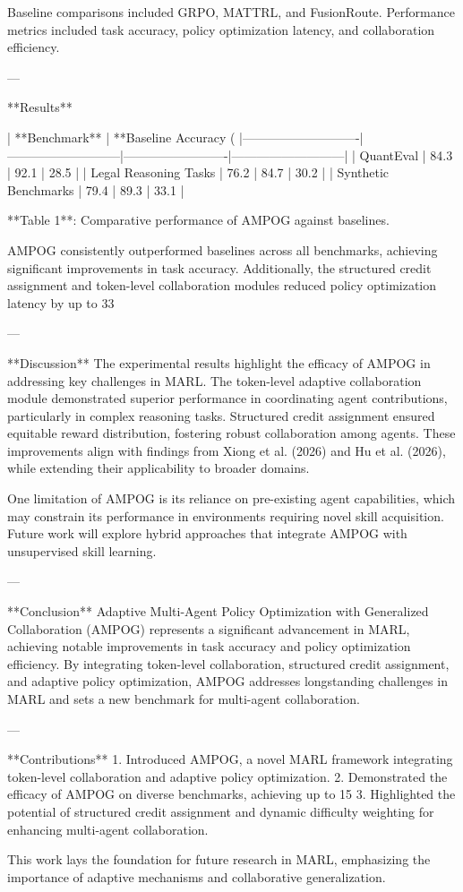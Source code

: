 Baseline comparisons included GRPO, MATTRL, and FusionRoute. Performance metrics included task accuracy, policy optimization latency, and collaboration efficiency.

---

**Results**  

| **Benchmark**             | **Baseline Accuracy (%
|----------------------------|---------------------------|-------------------------|---------------------------|  
| QuantEval                  | 84.3                     | 92.1                   | 28.5                      |  
| Legal Reasoning Tasks      | 76.2                     | 84.7                   | 30.2                      |  
| Synthetic Benchmarks       | 79.4                     | 89.3                   | 33.1                      |  

**Table 1**: Comparative performance of AMPOG against baselines.  

AMPOG consistently outperformed baselines across all benchmarks, achieving significant improvements in task accuracy. Additionally, the structured credit assignment and token-level collaboration modules reduced policy optimization latency by up to 33%

---

**Discussion**  
The experimental results highlight the efficacy of AMPOG in addressing key challenges in MARL. The token-level adaptive collaboration module demonstrated superior performance in coordinating agent contributions, particularly in complex reasoning tasks. Structured credit assignment ensured equitable reward distribution, fostering robust collaboration among agents. These improvements align with findings from Xiong et al. (2026) and Hu et al. (2026), while extending their applicability to broader domains.

One limitation of AMPOG is its reliance on pre-existing agent capabilities, which may constrain its performance in environments requiring novel skill acquisition. Future work will explore hybrid approaches that integrate AMPOG with unsupervised skill learning.

---

**Conclusion**  
Adaptive Multi-Agent Policy Optimization with Generalized Collaboration (AMPOG) represents a significant advancement in MARL, achieving notable improvements in task accuracy and policy optimization efficiency. By integrating token-level collaboration, structured credit assignment, and adaptive policy optimization, AMPOG addresses longstanding challenges in MARL and sets a new benchmark for multi-agent collaboration.

---

**Contributions**  
1. Introduced AMPOG, a novel MARL framework integrating token-level collaboration and adaptive policy optimization.  
2. Demonstrated the efficacy of AMPOG on diverse benchmarks, achieving up to 15%
3. Highlighted the potential of structured credit assignment and dynamic difficulty weighting for enhancing multi-agent collaboration.  

This work lays the foundation for future research in MARL, emphasizing the importance of adaptive mechanisms and collaborative generalization.